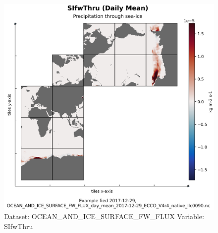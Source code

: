 \begin{figure}[H]
\centering
\includegraphics[width=\textwidth]{../images/plots/native_plots/Ocean_and_Sea-Ice_Surface_Freshwater_Fluxes/SIfwThru.png}
\caption{Dataset: OCEAN\_AND\_ICE\_SURFACE\_FW\_FLUX Variable: SIfwThru}
\label{tab:table-OCEAN_AND_ICE_SURFACE_FW_FLUX_SIfwThru-Plot}
\end{figure}
\pagebreak
